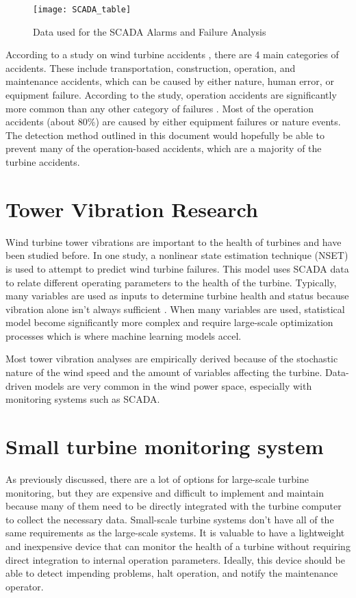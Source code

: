 \begin{figure}
	\centering
	\texttt{[image: SCADA\_table]}
	\decoRule
	\caption{Data used for the SCADA Alarms and Failure Analysis \cite{wind_turbine_failures}}
	\label{fig:SCADA_table}
\end{figure}

According to a study on wind turbine accidents \cite{wind_turbine_accidents}, there are 4 main categories of accidents.  These include transportation, construction, operation, and maintenance accidents, which can be caused by either nature, human error, or equipment failure.  According to the study, operation accidents are significantly more common than any other category of failures \cite{wind_turbine_failures}.  Most of the operation accidents (about 80\%) are caused by either equipment failures or nature events.  The detection method outlined in this document would hopefully be able to prevent many of the operation-based accidents, which are a majority of the turbine accidents.

\section{Tower Vibration Research}
Wind turbine tower vibrations are important to the health of turbines and have been studied before.  In one study, a nonlinear state estimation technique \cite{NSET_vibration_modeling} (NSET) is used to attempt to predict wind turbine failures.  This model uses SCADA data to relate different operating parameters to the health of the turbine.  Typically, many variables are used as inputs to determine turbine health and status because vibration alone isn't always sufficient \cite{NSET_vibration_modeling}.  When many variables are used, statistical model become significantly more complex and require large-scale optimization processes which is where machine learning models accel.

Most tower vibration analyses are empirically derived because of the stochastic nature of the wind speed and the amount of variables affecting the turbine.  Data-driven models \cite{data_driven_online_monitoring} are very common in the wind power space, especially with monitoring systems such as SCADA.

\section{Small turbine monitoring system}
As previously discussed, there are a lot of options for large-scale turbine monitoring, but they are expensive and difficult to implement and maintain because many of them need to be directly integrated with the turbine computer to collect the necessary data.  Small-scale turbine systems don't have all of the same requirements as the large-scale systems.  It is valuable to have a lightweight and inexpensive device that can monitor the health of a turbine without requiring direct integration to internal operation parameters.  Ideally, this device should be able to detect impending problems, halt operation, and notify the maintenance operator.


